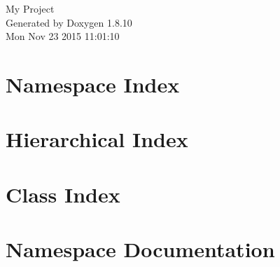 \documentclass[twoside]{book}
\newcommand{\+}{\discretionary{\mbox{\scriptsize$\hookleftarrow$}}{}{}}
\newcommand{\clearemptydoublepage}{%
  \newpage{\pagestyle{empty}\cleardoublepage}%
}
\begin{document}
\hypersetup{pageanchor=false,
             bookmarks=true,
             bookmarksnumbered=true,
             pdfencoding=unicode
            }
\begin{titlepage}
\vspace*{7cm}
\begin{center}%
{\Large My Project }\\
\vspace*{1cm}
{\large Generated by Doxygen 1.8.10}\\
\vspace*{0.5cm}
{\small Mon Nov 23 2015 11:01:10}\\
\end{center}
\end{titlepage}
\clearemptydoublepage
\tableofcontents
\clearemptydoublepage
{}
\hypersetup{pageanchor=true}

\chapter{Namespace Index}

\chapter{Hierarchical Index}

\chapter{Class Index}

\chapter{Namespace Documentation}















\end{document}
